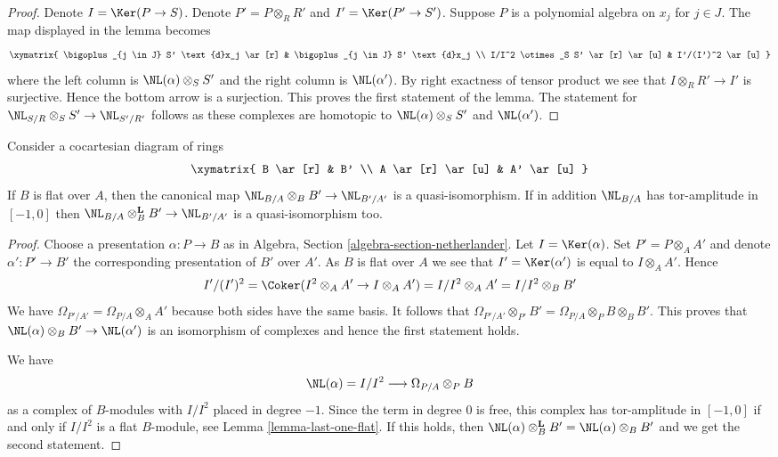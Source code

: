 \begin{proof}
Denote $I = \Ker(P \to S)$. Denote $P' = P \otimes_R R'$ and
$I' = \Ker(P' \to S')$. Suppose $P$ is a polynomial algebra
on $x_j$ for $j \in J$. The map displayed in the lemma becomes
$$
\xymatrix{
\bigoplus_{j \in J} S' \text{d}x_j \ar[r] &
\bigoplus_{j \in J} S' \text{d}x_j \\
I/I^2 \otimes_S S' \ar[r] \ar[u] &
I'/(I')^2 \ar[u]
}
$$
where the left column is $\NL(\alpha) \otimes_S S'$ and the right
column is $\NL(\alpha')$. By right exactness of tensor product we
see that $I \otimes_R R' \to I'$ is surjective. Hence the bottom arrow
is a surjection. This proves the first statement of the lemma.
The statement for $\NL_{S/R} \otimes_S S' \to \NL_{S'/R'}$
follows as these complexes are homotopic to $\NL(\alpha) \otimes_S S'$ and
$\NL(\alpha')$.
\end{proof}

\begin{lemma}
\label{lemma-base-change-NL-flat}
Consider a cocartesian diagram of rings
$$
\xymatrix{
B \ar[r] & B' \\
A \ar[r] \ar[u] & A' \ar[u]
}
$$
If $B$ is flat over $A$, then the canonical map
$\NL_{B/A} \otimes_B B' \to \NL_{B'/A'}$ is a quasi-isomorphism.
If in addition $\NL_{B/A}$ has tor-amplitude in $[-1, 0]$
then $\NL_{B/A} \otimes_B^\mathbf{L} B' \to \NL_{B'/A'}$
is a quasi-isomorphism too.
\end{lemma}

\begin{proof}
Choose a presentation $\alpha : P \to B$ as in
Algebra, Section \ref{algebra-section-netherlander}.
Let $I = \Ker(\alpha)$. Set $P' = P \otimes_A A'$ and denote
$\alpha' : P' \to B'$ the corresponding presentation of $B'$ over $A'$.
As $B$ is flat over $A$ we see that $I' = \Ker(\alpha')$ is equal
to $I \otimes_A A'$. Hence
$$
I'/(I')^2 = \Coker(I^2 \otimes_A A' \to I \otimes_A A') =
I/I^2 \otimes_A A' = I/I^2 \otimes_B B'
$$
We have $\Omega_{P'/A'} = \Omega_{P/A} \otimes_A A'$
because both sides have the same basis. It follows that
$\Omega_{P'/A'} \otimes_{P'} B' = \Omega_{P/A} \otimes_P B \otimes_B B'$.
This proves that $\NL(\alpha) \otimes_B B' \to \NL(\alpha')$
is an isomorphism of complexes and hence the first statement holds.

\medskip\noindent
We have
$$
\NL(\alpha) = I/I^2 \longrightarrow \Omega_{P/A} \otimes_P B
$$
as a complex of $B$-modules with $I/I^2$ placed in degree $-1$.
Since the term in degree $0$ is free, this complex has tor-amplitude
in $[-1, 0]$ if and only if $I/I^2$ is a flat $B$-module, see
Lemma \ref{lemma-last-one-flat}.
If this holds, then $\NL(\alpha) \otimes_B^\mathbf{L} B' =
\NL(\alpha) \otimes_B B'$ and we get the second statement.
\end{proof}

